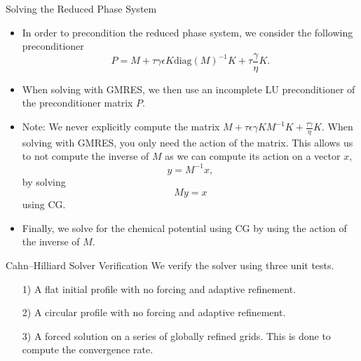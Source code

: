 \documentclass[9pt]{beamer}
\newcommand{\eps}{\epsilon}
\begin{document}
\begin{frame}{Solving the Reduced Phase System}
	\begin{itemize}
		\item In order to precondition the reduced phase system, we consider the following preconditioner
		$$
			P = M + \tau\gamma\eps K\text{diag}(M)^{-1}K + \tau\frac{\gamma}{\eta}K.
		$$
		\item When solving with GMRES, we then use an incomplete LU preconditioner of the preconditioner matrix $P$.
		
		\item Note: We never explicitly compute the matrix $M + \tau\eps\gamma KM^{-1}K + \frac{\tau \gamma}{\eta}K$. When solving with GMRES, you only need the action of the matrix. This allows us to not compute the inverse of $M$ as we can compute its action on a vector $x$,
		$$
			y = M^{-1}x,
		$$
		by solving
		$$
			My = x
		$$
		using CG.
		\item Finally, we solve for the chemical potential using CG by using the action of the inverse of $M$.
	\end{itemize}
\end{frame}

\begin{frame}{Cahn--Hilliard Solver Verification}
	We verify the solver using three unit tests.
	\vspace{.1in}
	\begin{itemize}
		\item[1)] A flat initial profile with no forcing and adaptive refinement.
			\vspace{.1in}
		\item[2)] A circular profile with no forcing and adaptive refinement.
			\vspace{.1in}
		\item[3)] A forced solution on a series of globally refined grids. This is done to compute the convergence rate.
	\end{itemize}
\end{frame}
\end{document}

